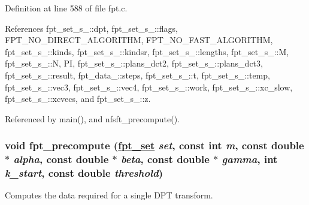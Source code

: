 Definition at line 588 of file fpt.c.

References fpt\_\-set\_\-s\_\-::dpt, fpt\_\-set\_\-s\_\-::flags, FPT\_\-NO\_\-DIRECT\_\-ALGORITHM, FPT\_\-NO\_\-FAST\_\-ALGORITHM, fpt\_\-set\_\-s\_\-::kinds, fpt\_\-set\_\-s\_\-::kindsr, fpt\_\-set\_\-s\_\-::lengths, fpt\_\-set\_\-s\_\-::M, fpt\_\-set\_\-s\_\-::N, PI, fpt\_\-set\_\-s\_\-::plans\_\-dct2, fpt\_\-set\_\-s\_\-::plans\_\-dct3, fpt\_\-set\_\-s\_\-::result, fpt\_\-data\_\-::steps, fpt\_\-set\_\-s\_\-::t, fpt\_\-set\_\-s\_\-::temp, fpt\_\-set\_\-s\_\-::vec3, fpt\_\-set\_\-s\_\-::vec4, fpt\_\-set\_\-s\_\-::work, fpt\_\-set\_\-s\_\-::xc\_\-slow, fpt\_\-set\_\-s\_\-::xcvecs, and fpt\_\-set\_\-s\_\-::z.

Referenced by main(), and nfsft\_\-precompute().\hypertarget{group__fpt_ga2}{
\subsubsection[fpt\_\-precompute]{\setlength{\rightskip}{0pt plus 5cm}void fpt\_\-precompute (\hyperlink{structfpt__set__s__}{fpt\_\-set} {\em set}, const int {\em m}, const double $\ast$ {\em alpha}, const double $\ast$ {\em beta}, const double $\ast$ {\em gamma}, int {\em k\_\-start}, const double {\em threshold})}}
\label{group__fpt_ga2}


Computes the data required for a single DPT transform. 

